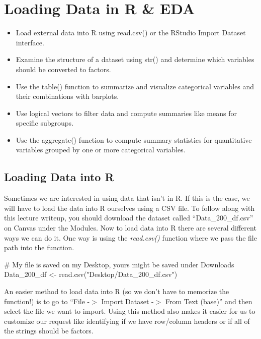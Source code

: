 \documentclass[
  letterpaper,
  DIV=11,
  numbers=noendperiod]{scrreprt}
\newenvironment{Shaded}{\begin{snugshade}}{\end{snugshade}}
\newcommand{\CommentTok}[1]{\textcolor[rgb]{0.37,0.37,0.37}{#1}}
\newcommand{\FunctionTok}[1]{\textcolor[rgb]{0.28,0.35,0.67}{#1}}
\newcommand{\NormalTok}[1]{\textcolor[rgb]{0.00,0.23,0.31}{#1}}
\newcommand{\OtherTok}[1]{\textcolor[rgb]{0.00,0.23,0.31}{#1}}
\newcommand{\StringTok}[1]{\textcolor[rgb]{0.13,0.47,0.30}{#1}}
\providecommand{\tightlist}{%
  \setlength{\itemsep}{0pt}\setlength{\parskip}{0pt}}
\begin{document}

\chapter{Loading Data in R \& EDA}\label{loading-data-in-r-eda}

\begin{itemize}
\tightlist
\item
  Load external data into R using read.csv() or the RStudio Import
  Dataset interface.
\item
  Examine the structure of a dataset using str() and determine which
  variables should be converted to factors.
\item
  Use the table() function to summarize and visualize categorical
  variables and their combinations with barplots.
\item
  Use logical vectors to filter data and compute summaries like means
  for specific subgroups.
\item
  Use the aggregate() function to compute summary statistics for
  quantitative variables grouped by one or more categorical variables.
\end{itemize}

\section{Loading Data into R}\label{loading-data-into-r}

Sometimes we are interested in using data that isn't in R. If this is
the case, we will have to load the data into R ourselves using a CSV
file. To follow along with this lecture writeup, you should download the
dataset called ``Data\_200\_df.csv'' on Canvas under the Modules. Now to
load data into R there are several different ways we can do it. One way
is using the \emph{read.csv()} function where we pass the file path into
the function.

\begin{Shaded}
\begin{Highlighting}[]
\CommentTok{\# My file is saved on my Desktop, yours might be saved under Downloads}
\NormalTok{Data\_200\_df }\OtherTok{\textless{}{-}} \FunctionTok{read.csv}\NormalTok{(}\StringTok{"Desktop/Data\_200\_df.csv"}\NormalTok{)}
\end{Highlighting}
\end{Shaded}

An easier method to load data into R (so we don't have to memorize the
function!) is to go to ``File -\(>\) Import Dataset -\(>\) From Text
(base)'' and then select the file we want to import. Using this method
also makes it easier for us to customize our request like identifying if
we have row/column headers or if all of the strings should be factors.
\end{document}
